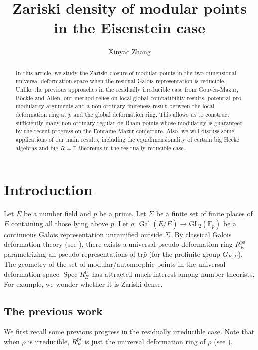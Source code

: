 \documentclass[a4paper, 12pt]{amsart}
\DeclareMathOperator{\Spec}{Spec}
\DeclareMathOperator{\Gal}{Gal}
\def\ps{\mathrm{ps}}
\newcommand{\F}{\mathbb{F}}
\newcommand{\T}{\mathbb{T}}
\newcommand{\tr}{\mathrm{tr}}
\newcommand{\GL}{\mathrm{GL}}
\begin{document}
	\title{Zariski density of modular points in the Eisenstein case}
	\author{Xinyao Zhang}
	\address{Graduate School of Mathematical Sciences, University of Tokyo, Komaba, Meguro, Tokyo 153-8914, Japan}
	\begin{abstract}
		In this article, we study the Zariski closure of modular points in the two-dimensional universal deformation space when the residual Galois representation is reducible. Unlike the previous approaches in the residually irreducible case from Gouv\^ea-Mazur, B\"ockle and Allen, our method relies on local-global compatibility results, potential pro-modularity arguments and a non-ordinary finiteness result between the local deformation ring at $p$ and the global deformation ring. This allows us to construct sufficiently many non-ordinary regular de Rham points whose modularity is guaranteed by the recent progress on the Fontaine-Mazur conjecture. Also, we will discuss some applications of our main results, including the equidimensionality of certain big Hecke algebras and big $R=\T$ theorems in the residually reducible case.
	\end{abstract}
	
	\maketitle
	
	\tableofcontents
	
	\section{Introduction}
	 
	 Let $E$ be a number field and $p$ be a prime. Let $\Sigma$ be a finite set of finite places of $E$ containing all those lying above $p$. Let $\bar{\rho} : \Gal(\overline{E}/E) \to \GL_2(\overline{\F_p})$ be a continuous Galois representation unramified outside $\Sigma$. By classical Galois deformation theory (see \cite[Proposition 2.3.1, page 42]{Berger_2013}), there exists a universal pseudo-deformation ring $R_E^\ps$ parametrizing all pseudo-representations of $\tr \bar{\rho}$ (for the profinite group $G_{E, \Sigma}$). The geometry of the set of modular/automorphic points in the universal deformation space $\Spec R_E^\ps$ has attracted much interest among number theorists. For example, we wonder whether it is Zariski dense.
	 
	 \subsection{The previous work}
	 We first recall some previous progress in the residually irreducible case. Note that when $\bar{\rho}$ is irreducible, $R_E^\ps$ is just the universal deformation ring of $\bar{\rho}$ (see \cite[Theorem 2.4.1, page 44]{Berger_2013}). 
	 
\end{document}
